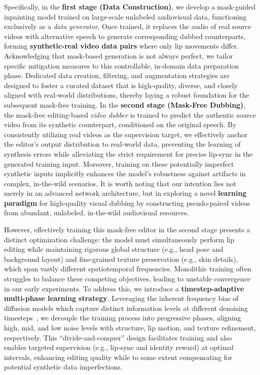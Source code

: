 \documentclass{article}
\theoremstyle{plain}
\theoremstyle{definition}
\theoremstyle{remark}
\begin{document}
Specifically, in the \textbf{first stage (Data Construction)}, we develop a mask-guided inpainting model trained on large-scale unlabeled audiovisual data, functioning exclusively as a \textit{data generator}.
Once trained, it replaces the audio of real source videos with alternative speech to generate corresponding dubbed counterparts, forming \textbf{synthetic-real video data pairs} where only lip movements differ.
Acknowledging that mask-based generation is not always perfect, we tailor specific mitigation measures to this controllable, in-domain data preparation phase.
Dedicated data creation, filtering, and augmentation strategies are designed to foster a curated dataset that is high-quality, diverse, and closely aligned with real-world distributions, thereby laying a robust foundation for the subsequent mask-free training.
In the \textbf{second stage (Mask-Free Dubbing)}, the mask-free editing-based \textit{video dubber} is trained to predict the authentic source video from its synthetic counterpart, conditioned on the original speech.
By consistently utilizing real videos as the supervision target, we effectively anchor the editor's output distribution to real-world data, preventing the learning of synthesis errors while alleviating the strict requirement for precise lip-sync in the generated training input.
Moreover, training on these potentially imperfect synthetic inputs implicitly enhances the model's robustness against artifacts in complex, in-the-wild scenarios.
It is worth noting that our intention lies not merely in an advanced network architecture, but in exploring a novel \textbf{learning paradigm} for high-quality visual dubbing by constructing pseudo-paired videos from abundant, unlabeled, in-the-wild audiovisual resources.

However, effectively training this mask-free editor in the second stage presents a distinct optimization challenge: the model must simultaneously perform lip editing while maintaining rigorous global structure (e.g., head pose and background layout) and fine-grained texture preservation (e.g., skin details), which span vastly different spatiotemporal frequencies.
Monolithic training often struggles to balance these competing objectives, leading to unstable convergence in our early experiments.
To address this, we introduce a \textbf{timestep-adaptive multi-phase learning strategy}.
Leveraging the inherent frequency bias of diffusion models which capture distinct information levels at different denoising timesteps~\citep{zhang2025flexiact, wang2025fantasytalking2}, we decouple the training process into progressive phases, aligning high, mid, and low noise levels with structure, lip motion, and texture refinement, respectively.
This ``divide-and-conquer'' design facilitates training and also enables targeted supervision (e.g., lip-sync and identity reward) at optimal intervals, enhancing editing quality while to some extent compensating for potential synthetic data imperfections.
\end{document}
